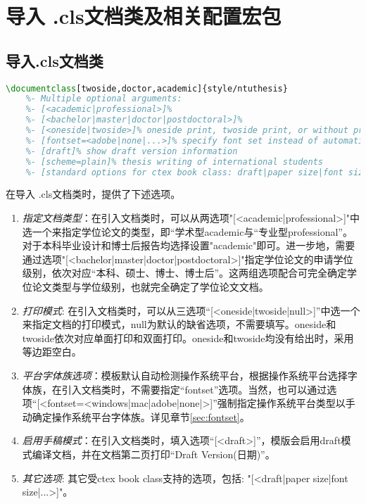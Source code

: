 \section{导入 \projectname.cls文档类及相关配置宏包}
\subsection{导入\projectname.cls文档类}
\begin{lstlisting}[language=tex]
    \documentclass[twoside,doctor,academic]{style/ntuthesis}
    %- Multiple optional arguments:
    %- [<academic|professional>]% 
    %- [<bachelor|master|doctor|postdoctoral>]%
    %- [<oneside|twoside>]% oneside print, twoside print, or without print
    %- [fontset=<adobe|none|...>]% specify font set instead of automatic detection
    %- [draft]% show draft version information
    %- [scheme=plain]% thesis writing of international students
    %- [standard options for ctex book class: draft|paper size|font size|...]%
 \end{lstlisting}%
在导入 \projectname.cls文档类时，提供了下述选项。
\begin{enumerate}
    \item \emph{指定文档类型}：在引入文档类时，可以从两选项"[<academic|professional>]"中选一个来指定学位论文的类型，即“学术型academic与“专业型professional”。对于本科毕业设计和博士后报告均选择设置"academic"即可。进一步地，需要通过选项"[<bachelor|master|doctor|postdoctoral>]"指定学位论文的申请学位级别，依次对应“本科、硕士、博士、博士后”。这两组选项配合可完全确定学位论文类型与学位级别，也就完全确定了学位论文文档。
    \item \emph{打印模式}: 在引入文档类时，可以从三选项“[<oneside|twoside|null>]”中选一个来指定文档的打印模式，null为默认的缺省选项，不需要填写。oneside和twoside依次对应单面打印和双面打印。oneside和twoside均没有给出时，采用等边距空白。
    \item \emph{平台字体族选项}：模板默认自动检测操作系统平台，根据操作系统平台选择字体族，在引入文档类时，不需要指定“fontset”选项。当然，也可以通过选项“[<fontset=<windows|mac|adobe|none|>]”强制指定操作系统平台类型以手动确定操作系统平台字体族。详见章节\ref{sec:fontset}。
    \item \emph{启用手稿模式}：在引入文档类时，填入选项“[<draft>]”，模版会启用draft模式编译文档，并在文档第二页打印“Draft Version(日期)”。
    \item \emph{其它选项}: 其它受ctex book class支持的选项，包括: "[<draft|paper size|font size|...>]"。
\end{enumerate}



